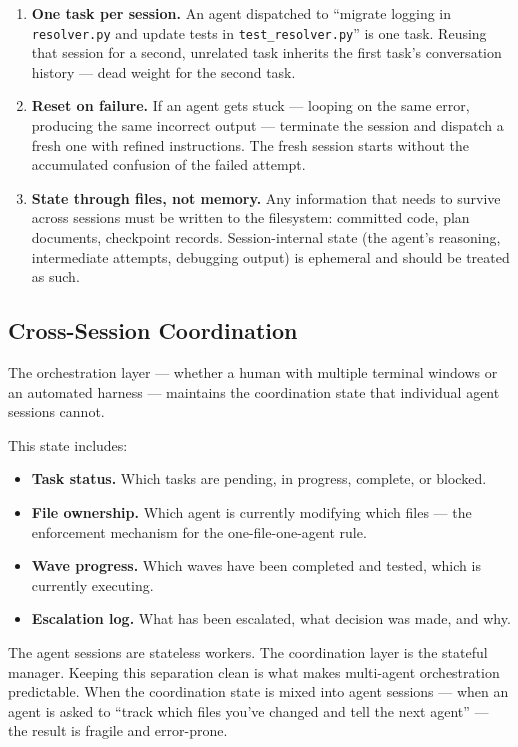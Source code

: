 \documentclass[
  a4paper,
  DIV=11,
  numbers=noendperiod]{scrreprt}
\providecommand{\tightlist}{%
  \setlength{\itemsep}{0pt}\setlength{\parskip}{0pt}}
\begin{document}
\begin{enumerate}
\def\labelenumi{\arabic{enumi}.}
\item
  \textbf{One task per session.} An agent dispatched to ``migrate
  logging in \texttt{resolver.py} and update tests in
  \texttt{test\_resolver.py}'' is one task. Reusing that session for a
  second, unrelated task inherits the first task's conversation history
  --- dead weight for the second task.
\item
  \textbf{Reset on failure.} If an agent gets stuck --- looping on the
  same error, producing the same incorrect output --- terminate the
  session and dispatch a fresh one with refined instructions. The fresh
  session starts without the accumulated confusion of the failed
  attempt.
\item
  \textbf{State through files, not memory.} Any information that needs
  to survive across sessions must be written to the filesystem:
  committed code, plan documents, checkpoint records. Session-internal
  state (the agent's reasoning, intermediate attempts, debugging output)
  is ephemeral and should be treated as such.
\end{enumerate}

\subsection{Cross-Session
Coordination}\label{cross-session-coordination}

The orchestration layer --- whether a human with multiple terminal
windows or an automated harness --- maintains the coordination state
that individual agent sessions cannot.

This state includes:

\begin{itemize}
\tightlist
\item
  \textbf{Task status.} Which tasks are pending, in progress, complete,
  or blocked.
\item
  \textbf{File ownership.} Which agent is currently modifying which
  files --- the enforcement mechanism for the one-file-one-agent rule.
\item
  \textbf{Wave progress.} Which waves have been completed and tested,
  which is currently executing.
\item
  \textbf{Escalation log.} What has been escalated, what decision was
  made, and why.
\end{itemize}

The agent sessions are stateless workers. The coordination layer is the
stateful manager. Keeping this separation clean is what makes
multi-agent orchestration predictable. When the coordination state is
mixed into agent sessions --- when an agent is asked to ``track which
files you've changed and tell the next agent'' --- the result is fragile
and error-prone.
\end{document}
